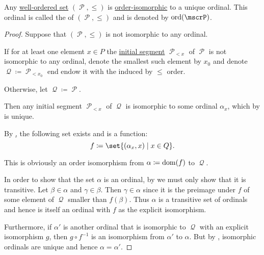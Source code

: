 \begin{proposition}\label{thm:order_type_existence}
  Any \hyperref[def:well_ordered_set]{well-ordered set} \( (\mscrP, \leq) \) is \hyperref[def:poset/homomorphism]{order-isomorphic} to a unique ordinal. This ordinal is called the  of \( (\mscrP, \leq) \) and is denoted by \( \ord(\mscrP) \).
\end{proposition}
\begin{proof}
  Suppose that \( (\mscrP, \leq) \) is not isomorphic to any ordinal.

  If for at least one element \( x \in P \) the \hyperref[def:poset_interval/ray]{initial segment} \( \mscrP_{<x} \) of \( \mscrP \) is not isomorphic to any ordinal, denote the smallest such element by \( x_0 \) and denote \( \mscrQ \coloneqq \mscrP_{<x_0} \) end endow it with the induced by \( \leq \) order.

  Otherwise, let \( \mscrQ \coloneqq \mscrP \).

  Then any initial segment \( \mscrP_{<x} \) of \( \mscrQ \) is isomorphic to some ordinal \( \alpha_x \), which by  is unique.

  By \hyperref[def:zfc/choice], the following set exists and is a function:
  \begin{equation*}
    f \coloneqq \set{ (\alpha_x, x) \given x \in Q }.
  \end{equation*}

  This is obviously an order isomorphism from \( \alpha \coloneqq \operatorname{dom}(f) \) to \( \mscrQ \).

  In order to show that the set \( \alpha \) is an ordinal, by  we must only show that it is transitive. Let \( \beta \in \alpha \) and \( \gamma \in \beta \). Then \( \gamma \in \alpha \) since it is the preimage under \( f \) of some element of \( \mscrQ \) smaller than \( f(\beta) \). Thus \( \alpha \) is a transitive set of ordinals and hence is itself an ordinal with \( f \) as the explicit isomorphism.

  Furthermore, if \( \alpha' \) is another ordinal that is isomorphic to \( \mscrQ \) with an explicit isomorphism \( g \), then \( g \circ f^{-1} \) is an isomorphism from \( \alpha' \) to \( \alpha \). But by , isomorphic ordinals are unique and hence \( \alpha = \alpha' \).
\end{proof}
